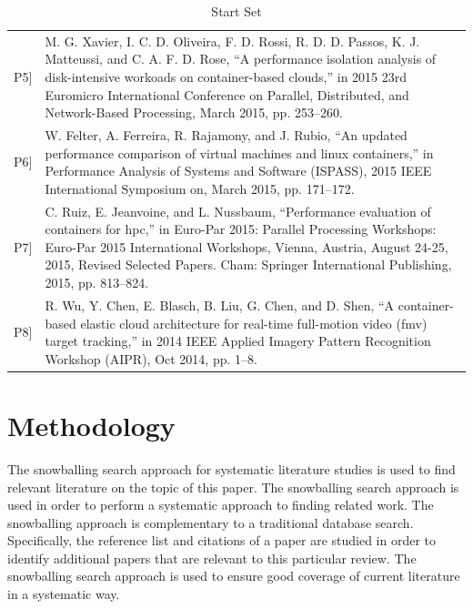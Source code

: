 \begin{table}[ht]
\begin{tabular}{| >{\centering}m{1.3cm} |>{\arraybackslash}m{12.7cm}|}
{[}P5{]}  & M. G. Xavier, I. C. D. Oliveira, F. D. Rossi, R. D. D. Passos, K. J. Matteussi, and C. A. F. D. Rose, “A performance isolation analysis of disk-intensive workoads on container-based clouds,” in 2015 23rd Euromicro International Conference on Parallel, Distributed, and Network-Based Processing, March 2015, pp. 253–260. \\
{[}P6{]}  & W. Felter, A. Ferreira, R. Rajamony, and J. Rubio, “An updated performance comparison of virtual machines and linux containers,” in Performance Analysis of Systems and Software (ISPASS), 2015 IEEE International Symposium on, March 2015, pp. 171–172.                                                                            \\
{[}P7{]}  & C. Ruiz, E. Jeanvoine, and L. Nussbaum, “Performance evaluation of containers for hpc,” in Euro-Par 2015: Parallel Processing Workshops: Euro-Par 2015 International Workshops, Vienna, Austria, August 24-25, 2015, Revised Selected Papers. Cham: Springer International Publishing, 2015, pp. 813–824. \\
{[}P8{]}  & R. Wu, Y. Chen, E. Blasch, B. Liu, G. Chen, and D. Shen, “A container-based elastic cloud architecture for real-time full-motion video (fmv) target tracking,” in 2014 IEEE Applied Imagery Pattern Recognition Workshop (AIPR), Oct 2014, pp. 1–8. \\ \hline
\end{tabular}
\centering
\caption{Start Set}
\label{lr-startset}
\end{table}


\section{Methodology}
The snowballing search approach for systematic literature studies is used to find relevant literature on the topic of this paper. The snowballing search approach is used in order to perform a systematic approach to finding related work. The snowballing approach is complementary to a traditional database search. Specifically, the reference list and citations of a paper are studied in order to identify additional papers that are relevant to this particular review. The snowballing search approach is used to ensure good coverage of current literature in a systematic way.\\

